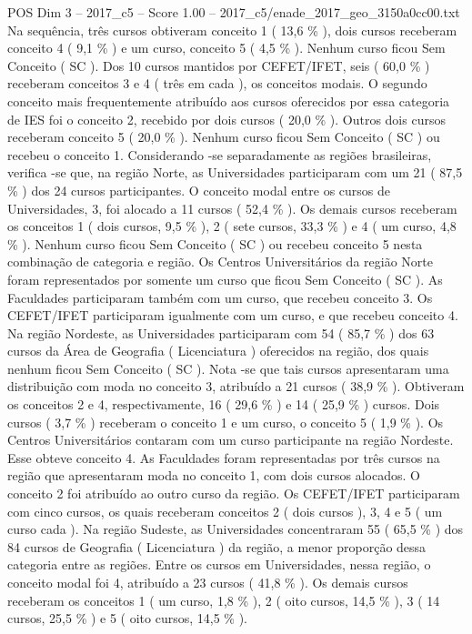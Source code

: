 \begin{textsample}{POS Dim 3 – 2017\_c5 – Score 1.00 – 2017\_c5/enade\_2017\_geo\_3150a0cc00.txt}
Na sequência, três cursos obtiveram conceito 1 ( 13,6 \% ), dois cursos receberam conceito 4 ( 9,1 \% ) e um curso, conceito 5 ( 4,5 \% ).
Nenhum curso ficou Sem Conceito ( SC ).
Dos 10 cursos mantidos por CEFET/IFET, seis ( 60,0 \% ) receberam conceitos 3 e 4 ( três em cada ), os conceitos modais.
O segundo conceito mais frequentemente atribuído aos cursos oferecidos por essa categoria de IES foi o conceito 2, recebido por dois cursos ( 20,0 \% ).
Outros dois cursos receberam conceito 5 ( 20,0 \% ).
Nenhum curso ficou Sem Conceito ( SC ) ou recebeu o conceito 1.
Considerando -se separadamente as regiões brasileiras, verifica -se que, na região Norte, as Universidades participaram com um 21 ( 87,5 \% ) dos 24 cursos participantes.
O conceito modal entre os cursos de Universidades, 3, foi alocado a 11 cursos ( 52,4 \% ).
Os demais cursos receberam os conceitos 1 ( dois cursos, 9,5 \% ), 2 ( sete cursos, 33,3 \% ) e 4 ( um curso, 4,8 \% ).
Nenhum curso ficou Sem Conceito ( SC ) ou recebeu conceito 5 nesta combinação de categoria e região.
Os Centros Universitários da região Norte foram representados por somente um curso que ficou Sem Conceito ( SC ).
As Faculdades participaram também com um curso, que recebeu conceito 3.
Os CEFET/IFET participaram igualmente com um curso, e que recebeu conceito 4.
Na região Nordeste, as Universidades participaram com 54 ( 85,7 \% ) dos 63 cursos da Área de Geografia ( Licenciatura ) oferecidos na região, dos quais nenhum ficou Sem Conceito ( SC ).
Nota -se que tais cursos apresentaram uma distribuição com moda no conceito 3, atribuído a 21 cursos ( 38,9 \% ).
Obtiveram os conceitos 2 e 4, respectivamente, 16 ( 29,6 \% ) e 14 ( 25,9 \% ) cursos.
Dois cursos ( 3,7 \% ) receberam o conceito 1 e um curso, o conceito 5 ( 1,9 \% ).
Os Centros Universitários contaram com um curso participante na região Nordeste.
Esse obteve conceito 4.
As Faculdades foram representadas por três cursos na região que apresentaram moda no conceito 1, com dois cursos alocados.
O conceito 2 foi atribuído ao outro curso da região.
Os CEFET/IFET participaram com cinco cursos, os quais receberam conceitos 2 ( dois cursos ), 3, 4 e 5 ( um curso cada ).
Na região Sudeste, as Universidades concentraram 55 ( 65,5 \% ) dos 84 cursos de Geografia ( Licenciatura ) da região, a menor proporção dessa categoria entre as regiões.
Entre os cursos em Universidades, nessa região, o conceito modal foi 4, atribuído a 23 cursos ( 41,8 \% ).
Os demais cursos receberam os conceitos 1 ( um curso, 1,8 \% ), 2 ( oito cursos, 14,5 \% ), 3 ( 14 cursos, 25,5 \% ) e 5 ( oito cursos, 14,5 \% ).

\end{textsample}

